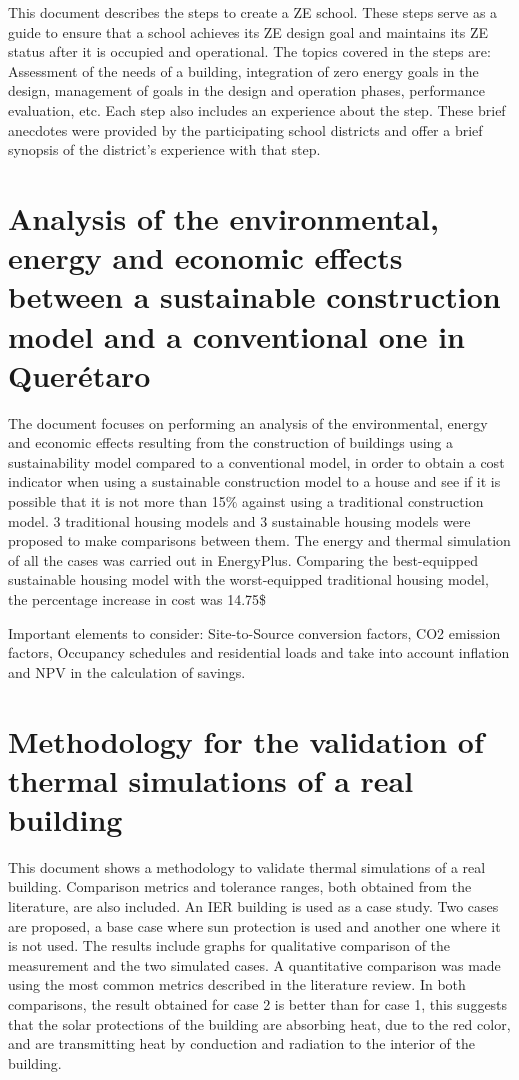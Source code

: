 This document describes the steps to create a ZE school. These steps serve as a guide to ensure that a school achieves its ZE design goal and maintains its ZE status after it is occupied and operational. The topics covered in the steps are: Assessment of the needs of a building, integration of zero energy goals in the design, management of goals in the design and operation phases, performance evaluation, etc. Each step also includes an experience about the step. These brief anecdotes were provided by the participating school districts and offer a brief synopsis of the district's experience with that step.


\section{Analysis of the environmental, energy and economic effects between a sustainable construction model and a conventional one in Querétaro}

The document focuses on performing an analysis of the environmental, energy and economic effects resulting from the construction of buildings using a sustainability model compared to a conventional model, in order to obtain a cost indicator when using a sustainable construction model to a house and see if it is possible that it is not more than 15$\%$ against using a traditional construction model. 3 traditional housing models and 3 sustainable housing models were proposed to make comparisons between them. The energy and thermal simulation of all the cases was carried out in EnergyPlus. Comparing the best-equipped sustainable housing model with the worst-equipped traditional housing model, the percentage increase in cost was 14.75\$%

Important elements to consider: Site-to-Source conversion factors, CO2 emission factors, Occupancy schedules and residential loads and take into account inflation and NPV in the calculation of savings.

\section{Methodology for the validation of thermal simulations of a real building}

This document shows a methodology to validate thermal simulations of a real building. Comparison metrics and tolerance ranges, both obtained from the literature, are also included. An IER building is used as a case study. Two cases are proposed, a base case where sun protection is used and another one where it is not used. The results include graphs for qualitative comparison of the measurement and the two simulated cases. A quantitative comparison was made using the most common metrics described in the literature review. In both comparisons, the result obtained for case 2 is better than for case 1, this suggests that the solar protections of the building are absorbing heat, due to the red color, and are transmitting heat by conduction and radiation to the interior of the building.


